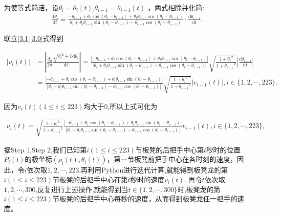 \documentclass[../main.tex]{subfiles}
\begin{document}
  \par 为使等式简洁，设\(\theta _i = \theta _i(t)\),\(\theta _{i - 1} = \theta _{i - 1}(t)\) ，两式相除并化简:
      \begin{align}
  \frac{\mathrm{d}\theta _i}{\mathrm{d}t}=\frac{-\theta _{i - 1}+\theta _i\cos(\theta _{i }-\theta _{i-1})+\theta _i\theta _{i - 1}\sin(\theta _{i }-\theta _{i-1})}{\theta _i+\theta _i\theta _{i - 1}\sin(\theta _i -\theta _{i-1})-\theta _{i - 1}\cos(\theta _i -\theta _{i-1})}\cdot \frac{\mathrm{d}\theta _{i - 1}}{\mathrm{d}t}.\label{3.0}
  \end{align}
  \par 联立\eqref{3.1}\eqref{3.0}式得到
\begin{small}
  \begin{align}
 |v_i(t)| &= \left|\frac{d_0}{2\pi}\frac{\sqrt{{\theta _i}^2 + 1}\mathrm{d}\theta _i}{\mathrm{d}t}\right| 
  = \frac{|-\theta _{i - 1}+\theta _i\cos(\theta _{i }-\theta _{i-1})+\theta _i\theta _{i - 1}\sin(\theta _{i }-\theta _{i-1})|}{|\theta _i+\theta _i\theta _{i - 1}\sin(\theta _i -\theta _{i-1})-\theta _{i - 1}\cos(\theta _i -\theta _{i-1})|}\sqrt{\frac{1 + {\theta _i}^2}{1 + {\theta _{i - 1}}^2}}\left|\frac{\mathrm{d}\theta _{i - 1}}{\mathrm{d}t}\right| \\
  &= \frac{|-\theta _{i - 1}+\theta _i\cos(\theta _{i }-\theta _{i-1})+\theta _i\theta _{i - 1}\sin(\theta _{i }-\theta _{i-1})|}{|\theta _i+\theta _i\theta _{i - 1}\sin(\theta _i -\theta _{i-1})-\theta _{i - 1}\cos(\theta _i -\theta _{i-1})|}\sqrt{\frac{1 + {\theta _i}^2}{1 + {\theta _{i - 1}}^2}}|v_{i - 1}(t)|, i\in \{1, 2, \cdots, 223\}.\label{1.........16}
  \end{align}
\end{small}

  \par 因为\(v_i(t) (1\leqslant i\leqslant 223)\)均大于\(0\),所以上式可化为
  \begin{small}
  \begin{align}\label{1.........17}
  v_i(t) = \sqrt{\frac{1 + {\theta _i}^2}{1 + {\theta _{i - 1}}^2}}\frac{|-\theta _{i - 1}+\theta _i\cos(\theta _{i }-\theta _{i-1})+\theta _i\theta _{i - 1}\sin(\theta _{i }-\theta _{i-1})|}{|\theta _i+\theta _i\theta _{i - 1}\sin(\theta _i -\theta _{i-1})-\theta _{i - 1}\cos(\theta _i -\theta _{i-1})|}v_{i - 1}(t), i\in \{1, 2, \cdots, 223\},
  \end{align}
\end{small}
  \par 据Step 1,Step 2,我们已知第\(i(1\leqslant i\leqslant 223)\)节板凳的后把手中心第\(t\)秒时的位置\(P_{i}(t)\)的极坐标\((\rho _{i}(t),\theta _{i}(t))\)，第一节板凳前把手中心在各时刻的速度，因此，令\(i\)依次取\(1, 2, \cdots, 223\),再利用Python进行迭代计算,就能得到板凳龙的第\(i(1\leqslant i\leqslant 223)\)节板凳的后把手中心在第\(t\)秒时的速度\(v_i(t)\).
  再令\(t\)依次取\(1, 2, \cdots, 300\),反复进行上述操作,就能得到当\(t\in \{1, 2, \cdots, 300\}\)时,板凳龙的第\(i(1\leqslant i\leqslant 223)\)节板凳的后把手中心每秒的速度，从而得到板凳龙任一把手的速度。
  
  
\end{document}
